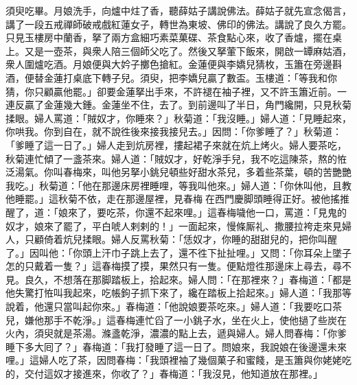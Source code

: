 須臾吃畢。月娘洗手，向爐中炷了香，聽薛姑子講說佛法。薛姑子就先宣念偈言，講了一段五戒禪師破戒戲紅蓮女子，轉世為東坡、佛印的佛法。講說了良久方罷。只見玉樓房中蘭香，拏了兩方盒細巧素菜菓碟、茶食點心來，收了香爐，擺在桌上。又是一壺茶，與衆人陪三個師父吃了。然後又拏葷下飯來，開啟一罈麻姑酒，衆人圍爐吃酒。月娘便與大妗子擲色搶紅。金蓮便與李嬌兒猜枚，玉簫在旁邊斟酒，便替金蓮打桌底下轉子兒。須臾，把李嬌兒贏了數盃。{}玉樓道：「等我和你猜，你只顧贏他罷。」卻要金蓮拏出手來，不許褪在袖子裡，又不許玉簫近前。{}一連反贏了金蓮幾大鍾。金蓮坐不住，去了。到前邊叫了半日，角門纔開，只見秋菊揉眼。婦人罵道：「賊奴才，你睡來？」秋菊道：「我沒睡。」{}婦人道：「見睡起來，你哄我。你到自在，就不說徃後來接我接兒去。」因問：「你爹睡了？」秋菊道：「爹睡了這一日了。」婦人走到炕房裡，摟起裙子來就在炕上烤火。婦人要茶吃，秋菊連忙傾了一盞茶來。婦人道：「賊奴才，好乾淨手兒，我不吃這陳茶，熬的恠泛湯氣。你叫春梅來，叫他另拏小銚兒頓些好甜水茶兒，多着些茶葉，頓的苦艷艷我吃。」秋菊道：「他在那邊床房裡睡哩，等我叫他來。」婦人道：「你休叫他，且教他睡罷。」{}這秋菊不依，走在那邊屋裡，見春梅𢱉在西門慶脚頭睡得正好。{}被他搖推醒了，道：「娘來了，要吃茶，你還不起來哩。」這春梅噦他一口，罵道：「見鬼的奴才，娘來了罷了，平白唬人剌剌的！」一面起來，慢條厮礼、撒腰拉袴走來見婦人，只顧倚着炕兒揉眼。婦人反罵秋菊：「恁奴才，你睡的甜甜兒的，把你叫醒了。」因叫他：「你頭上汗巾子跳上去了，還不徃下扯扯哩。」又問：「你耳朵上墜子怎的只戴着一隻？」這春梅摸了摸，果然只有一隻。便點燈徃那邊床上尋去，尋不見。良久，不想落在那脚踏板上，拾起來。婦人問：「在那裡來？」春梅道：「都是他失驚打恠叫我起來，吃帳鉤子抓下來了，纔在踏板上拾起來。」{}婦人道：「我那等說着，他還只當叫起你來。」春梅道：「他說娘要茶吃來。」婦人道：「我要吃口茶兒，嫌他那手不乾淨。」這春梅連忙舀了一小銚子水，坐在火上，使他撾了些炭在火內，須臾就是茶湯。滌盞乾淨，濃濃的點上去，遞與婦人。婦人問春梅：「你爹睡下多大囘了？」春梅道：「我打發睡了這一日了。問娘來，我說娘在後邊還未來哩。」這婦人吃了茶，因問春梅：「我頭裡袖了幾個菓子和蜜餞，是玉簫與你姥姥吃的，交付這奴才接進來，你收了？」春梅道：「我沒見，他知道放在那裡。」

